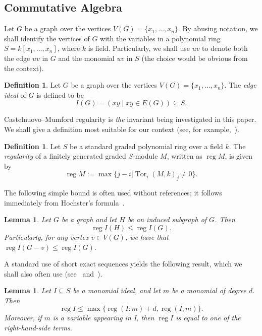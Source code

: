 \documentclass[10pt]{amsart}
\newtheorem{lemm}[theo]{Lemma}
\theoremstyle{definition}
\newtheorem{defi}[theo]{Definition}
\DeclareMathOperator{\reg}{reg}
\DeclareMathOperator{\Tor}{Tor}
\begin{document}
\subsection{Commutative Algebra} 
Let $G$ be a graph over the vertices $V(G)  = \{x_1, \dots, x_n\}$. By abusing notation, we shall identify the vertices of $G$ with the variables in a polynomial ring $S = k[x_1, \dots, x_n]$, where $k$ is field. Particularly, we shall use $uv$ to denote both the edge $uv$ in $G$ and the monomial $uv$ in $S$ (the choice would be obvious from the context).

\begin{defi} Let $G$ be a graph over the vertices $V(G) = \{x_1, \dots, x_n\}$. The \emph{edge ideal} of $G$ is defined to be
\[
I(G) =( xy  \mid  xy \in E(G)) \subseteq S.
\]

\end{defi}

Castelnuovo--Mumford regularity is \emph{the} invariant being investigated in this paper. We shall give a definition most suitable for our context (see, for example,~\cite[p. 168]{BrHe}).

\begin{defi}
Let $S$ be a standard graded polynomial ring over a field $k$. The \emph{regularity} of a finitely generated graded $S$-module $M$, written as $\reg M$, is given by
\[
\reg M := \max \{j-i|\Tor_{i} (M,k)_j \neq 0 \}.
\]

\end{defi}



The following simple bound is often used without references; it follows immediately from Hochster's formula~\cite[Theorem 5.1]{Hochster}.

\begin{lemm}\label{lem.indsubgraph}
Let $G$ be a graph and let $H$ be an induced subgraph of $G$. Then
\[
\reg I(H) \le \reg I(G).
\]
Particularly, for any vertex $v \in V(G)$, we have that $\reg I(G - v) \le \reg I(G).$
\end{lemm}

A standard use of short exact sequences yields the following result, which we shall also often use (see~\cite[Lemma 2.10]{DHS} and~\cite[Lemma 2.11]{Ba}).

\begin{lemm}\label{exact}
Let $I \subseteq S$ be a monomial ideal, and let $m$ be a monomial of degree $d$. Then
\[
\reg I \le \max\{ \reg (I : m) + d, \reg (I,m)\}.
\]
Moreover, if $m$ is a variable appearing in I, then $\reg I$ is \emph{equal} to one of the right-hand-side terms.
\end{lemm}
\end{document}
